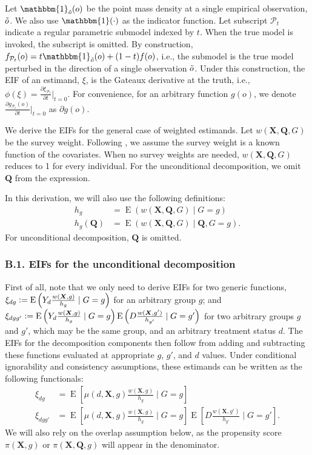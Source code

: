 \documentclass[12pt,a4paper]{article}
\newcommand{\E}{\operatorname{E}}
\def\X{{\boldsymbol X}}
\def\Q{{\boldsymbol Q}}
\def\one{\mathbbm{1}}
\newcommand{\defeq}{\vcentcolon=}
\begin{document}
Let $\one_{\Tilde{o}}(o)$ be the point mass density at a single empirical observation,  $\Tilde{o}$. We also use $\one(\cdot)$ as the indicator function. Let subscript $\mathcal{P}_t$ indicate a regular parametric submodel indexed by $t$. When the true model is invoked, the subscript is omitted. By construction, $f_{\mathcal{P}_t}(o)=t \one_{\Tilde{o}}(o) + (1-t)f(o)$, i.e., the submodel is the true model perturbed in the direction of a single observation $\Tilde{o}$. Under this construction, the EIF of an estimand, $\xi$, is the Gateaux derivative at the truth, i.e., $\phi(\xi)=\frac{\partial \xi_{\mathcal{P}_t}}{\partial t} \big|_{t=0}$. For convenience, for an arbitrary function $g(o)$, we denote $ \frac{\partial g_{\mathcal{P}_t}(o)}{\partial t} \big|_{t=0}$ as $\partial g(o)$. 

We derive the EIFs for the general case of  weighted estimands. Let $w(\X, \Q, G)$ be the  survey weight. Following \citet{hirano_efficient_2003}, we assume the survey weight is a known function of the covariates. When no survey weights are needed, $w(\X,\Q, G)$ reduces to 1 for every individual. For the unconditional decomposition, we omit $\Q$ from the expression.

In this derivation, we will also use the following definitions:
\begin{align*}
    h_g &= \E(w(\X, \Q, G) \mid G=g) \\
    h_g(\Q) &= \E(w(\X, \Q, G) \mid \Q, G=g).
\end{align*}
For unconditional decomposition, $\Q$ is omitted.

\subsubsection*{B.1. EIFs for the unconditional decomposition}
First of all, note that we only need to derive EIFs for two generic functions, $\xi_{dg} \defeq \E \left(Y_d \frac{ w(\X,g)}{h_g} \mid G=g  \right)$ for an arbitrary group $g$; and $\xi_{dgg'} \defeq \E \left(Y_d \frac{ w(\X,g)}{h_g} \mid G=g \right)\E \left(D \frac{ w(\X,g')}{h_{g'}}  \mid G=g' \right)$ for two arbitrary groups $g$ and $g'$, which may be the same group, and an arbitrary treatment status $d$. The EIFs for the decomposition components then follow from adding and subtracting these functions evaluated at appropriate $g$, $g'$, and $d$ values. Under conditional ignorability and consistency assumptions, these estimands can be written as the following functionals:
\begin{align*}
    \xi_{dg} &= \E \left[\mu(d,\X,g) \frac{ w(\X,g)}{h_g} \mid G=g \right] \\
    \xi_{dgg'} &= \E \left[\mu(d,\X,g) \frac{ w(\X,g)}{h_g} \mid G=g \right] \E \left[D \frac{ w(\X,g')}{h_{g'}}  \mid G=g' \right].
\end{align*}
We will also rely on the overlap assumption below, as the propensity score $\pi(\X,g)$ or $\pi(\X,\Q,g)$ will appear in the denominator.
\end{document}
